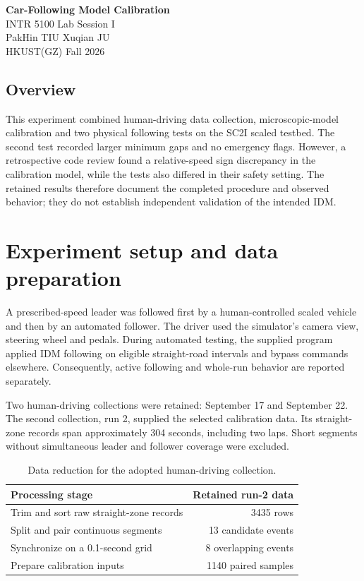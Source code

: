 \documentclass[11pt,a4paper]{article}
\begin{document}
        \begin{center}
        {\LARGE\bfseries Car-Following Model Calibration}\\[5pt]
        {\large INTR 5100 \quad Lab Session I}\\[5pt]
        PakHin TIU \quad Xuqian JU\\[3pt]
        HKUST(GZ) \quad Fall 2026
        \end{center}

\subsection*{Overview}

This experiment combined human-driving data collection, microscopic-model calibration and two physical following tests on the SC2I scaled testbed. The second test recorded larger minimum gaps and no emergency flags. However, a retrospective code review found a relative-speed sign discrepancy in the calibration model, while the tests also differed in their safety setting. The retained results therefore document the completed procedure and observed behavior; they do not establish independent validation of the intended IDM.


\section{Experiment setup and data preparation}

A prescribed-speed leader was followed first by a human-controlled scaled vehicle and then by an automated follower. The driver used the simulator's camera view, steering wheel and pedals. During automated testing, the supplied program applied IDM following on eligible straight-road intervals and bypass commands elsewhere. Consequently, active following and whole-run behavior are reported separately.


Two human-driving collections were retained: September 17 and September 22. The second collection, run 2, supplied the selected calibration data. Its straight-zone records span approximately 304 seconds, including two laps. Short segments without simultaneous leader and follower coverage were excluded.


\begin{table}[H]\centering\small
\caption{Data reduction for the adopted human-driving collection.}
\begin{tabular}{lr}
\toprule
Processing stage & Retained run-2 data \\
\midrule
Trim and sort raw straight-zone records & 3435 rows \\
Split and pair continuous segments & 13 candidate events \\
Synchronize on a 0.1-second grid & 8 overlapping events \\
Prepare calibration inputs & 1140 paired samples \\
\bottomrule\end{tabular}\end{table}
\end{document}
